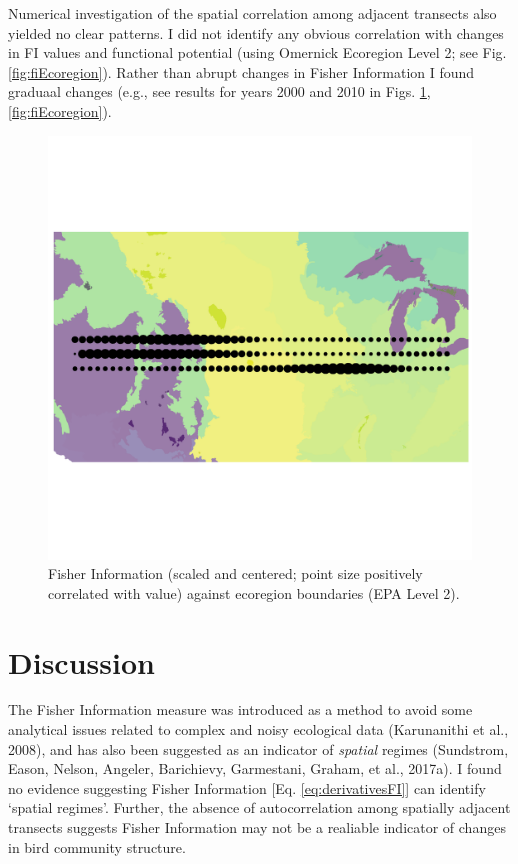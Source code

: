 \documentclass[12pt,twoside,openany]{reedthesis}
\begin{document}
Numerical investigation of the spatial correlation among adjacent transects also yielded no clear patterns. I did not identify any obvious correlation with changes in FI values and functional potential (using Omernick Ecoregion Level 2; see Fig. \ref{fig:fiEcoregion}). Rather than abrupt changes in Fisher Information I found graduaal changes (e.g., see results for years 2000 and 2010 in Figs. \ref{fig:fiEcoregion00},\ref{fig:fiEcoregion}).
\begin{figure}[h]

{\centering \includegraphics[width=0.85\linewidth]{./chapterFiles/fisherSpatial/figures/figsCalledInDiss/scaledFiInterpolated_year2000_East-West} 

}

\caption{Fisher Information (scaled and centered; point size positively correlated with value) against ecoregion boundaries (EPA Level 2).}\label{fig:fiEcoregion00}
\end{figure}
\hypertarget{discussion-1}{%
\section{Discussion}\label{discussion-1}}

The Fisher Information measure was introduced as a method to avoid some analytical issues related to complex and noisy ecological data (Karunanithi et al., 2008), and has also been suggested as an indicator of \emph{spatial} regimes (Sundstrom, Eason, Nelson, Angeler, Barichievy, Garmestani, Graham, et al., 2017a). I found no evidence suggesting Fisher Information {[}Eq. \eqref{eq:derivativesFI}{]} can identify `spatial regimes'. Further, the absence of autocorrelation among spatially adjacent transects suggests Fisher Information may not be a realiable indicator of changes in bird community structure.
\end{document}
